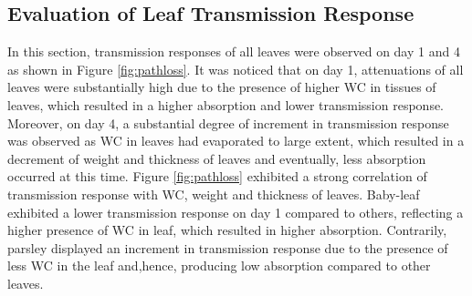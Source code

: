 \documentclass[journal,article,submit,moreauthors,pdftex]{Definitions/mdpi}
\renewcommand{\^}{\hat}  %
\begin{document}
\subsection{Evaluation of Leaf Transmission Response}
%
In this section, transmission responses of all leaves were observed on day 1 and 4 as shown in Figure \ref{fig:pathloss}. It was noticed that on day 1, attenuations of all leaves were substantially high due to the presence of higher WC in tissues of leaves, which resulted in a higher absorption and lower transmission response. Moreover, on day 4, a substantial degree of increment in transmission response was observed as WC in leaves had evaporated to large extent, which resulted in a decrement of weight and thickness of leaves and eventually, less absorption occurred at this time. Figure \ref{fig:pathloss} exhibited a strong correlation of transmission response with WC, weight and thickness of leaves. Baby-leaf exhibited a lower transmission response on day 1 compared to others, reflecting a higher presence of WC in leaf, which resulted in higher absorption. Contrarily, parsley displayed an increment in transmission response due to the presence of less WC in the leaf and,hence, producing low absorption compared to other leaves.
%
\end{document}
